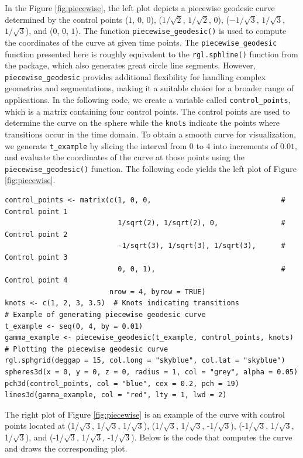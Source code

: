 In the Figure \ref{fig:piecewise}, the left plot depicts a piecewise geodesic curve determined by the control points (\(1\), \(0\), \(0\)), (\(1/\sqrt{2}\), \(1/\sqrt{2}\), \(0\)), (\(-1/\sqrt{3}\), \(1/\sqrt{3}\), \(1/\sqrt{3}\)), and (\(0\), \(0\), \(1\)). The function \texttt{piecewise\_geodesic()} is used to compute the coordinates of the curve at given time points.
The \texttt{piecewise\_geodesic} function presented here is roughly equivalent to the \texttt{rgl.sphline()} function from the  package, which also generates great circle line segments. However, \texttt{piecewise\_geodesic} provides additional flexibility for handling complex geometries and segmentations, making it a suitable choice for a broader range of applications.
In the following code, we create a variable called \texttt{control\_points}, which is a matrix containing four control points. The control points are used to determine the curve on the sphere while the \texttt{knots} indicate the points where transitions occur in the time domain. To obtain a smooth curve for visualization, we generate \texttt{t\_example} by slicing the interval from \(0\) to \(4\) into increments of \(0.01\), and evaluate the coordinates of the curve at those points using the \texttt{piecewise\_geodesic()} function. The following code yields the left plot of Figure \ref{fig:piecewise}.

\begin{verbatim}
control_points <- matrix(c(1, 0, 0,                               # Control point 1
                           1/sqrt(2), 1/sqrt(2), 0,               # Control point 2
                           -1/sqrt(3), 1/sqrt(3), 1/sqrt(3),      # Control point 3
                           0, 0, 1),                              # Control point 4
                         nrow = 4, byrow = TRUE)
knots <- c(1, 2, 3, 3.5)  # Knots indicating transitions
# Example of generating piecewise geodesic curve
t_example <- seq(0, 4, by = 0.01)
gamma_example <- piecewise_geodesic(t_example, control_points, knots)
# Plotting the piecewise geodesic curve
rgl.sphgrid(deggap = 15, col.long = "skyblue", col.lat = "skyblue")
spheres3d(x = 0, y = 0, z = 0, radius = 1, col = "grey", alpha = 0.05)
pch3d(control_points, col = "blue", cex = 0.2, pch = 19)
lines3d(gamma_example, col = "red", lty = 1, lwd = 2)
\end{verbatim}

The right plot of Figure \ref{fig:piecewise} is an example of the curve with control points located at (1/\(\sqrt{3}\), 1/\(\sqrt{3}\), 1/\(\sqrt{3}\)), (1/\(\sqrt{3}\), 1/\(\sqrt{3}\), -1/\(\sqrt{3}\)), (-1/\(\sqrt{3}\), 1/\(\sqrt{3}\), 1/\(\sqrt{3}\)), and (-1/\(\sqrt{3}\), 1/\(\sqrt{3}\), -1/\(\sqrt{3}\)). Below is the code that computes the curve and draws the corresponding plot.

